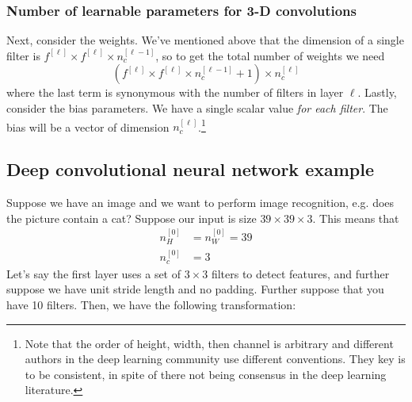 \documentclass[12pt]{article}
\begin{document}
\subsubsection{Number of learnable parameters for 3-D convolutions}
Next, consider the weights. We've mentioned above that the dimension of a single filter is $f^{[\ell]} \times f^{[\ell]} \times n_c^{[\ell-1]}$, so to get the total number of weights we need 
\[
\left(f^{[\ell]} \times f^{[\ell]} \times n_c^{[\ell-1]} + 1 \right) \times n_c^{[\ell]}
\]
where the last term is synonymous with the number of filters in layer $\ell$.
Lastly, consider the bias parameters. We have a single scalar value \emph{for each filter}. The bias will be a vector of dimension $n_c^{[\ell]}$.\footnote{Note that the order of height, width, then channel is arbitrary and different authors in the deep learning community use different conventions. They key is to be consistent, in spite of there not being consensus in the deep learning literature.}

\subsection{Deep convolutional neural network example} Suppose we have an image and we want to perform image recognition, e.g.
does the picture contain a cat? Suppose our input is size $39 \times 39 \times 3$. This means that 
\begin{align*}   
  n_H^{[0]} &= n_W^{[0]} = 39 \\
  n_c^{[0]} &= 3 
\end{align*}
Let's say the first layer uses a set of $3 \times 3$ filters to detect features, and further suppose we have unit stride length
and no padding. Further suppose that you have 10 filters. Then, we have the following transformation:
\begin{figure}[h]   \centering
   \end{figure}
\end{document}
